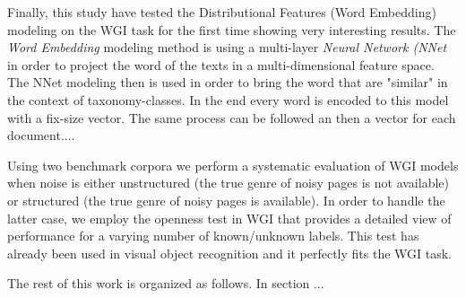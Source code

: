 \documentclass[
    11pt, %
    english, %
    singlespacing, %
    headsepline, %
]{DoctoralThesis} %
\begin{document}
Finally, this study have tested the Distributional Features (Word Embedding) modeling on the WGI task for the first time showing very interesting results. The \textit{Word Embedding} modeling method is using a multi-layer \textit{Neural Network (NNet} in order to project the word of the texts in a multi-dimensional feature space. The NNet modeling then is used in order to bring the word that are "similar" in the context of taxonomy-classes. In the end every word is encoded to this model with a fix-size vector. The same process can be followed an then a vector for each document....

Using two benchmark corpora we perform a systematic evaluation of WGI models when noise is either unstructured (the true genre of noisy pages is not available) or structured (the true genre of noisy pages is available). In order to handle the latter case, we employ the openness test in WGI that provides a detailed view of performance for a varying number of known/unknown labels. This test has already been used in visual object recognition \parencite{scheirer2013toward} and it perfectly fits the WGI task.

The rest of this work is organized as follows. In section ...











\printbibliography[heading=bibintoc]
\end{document}
